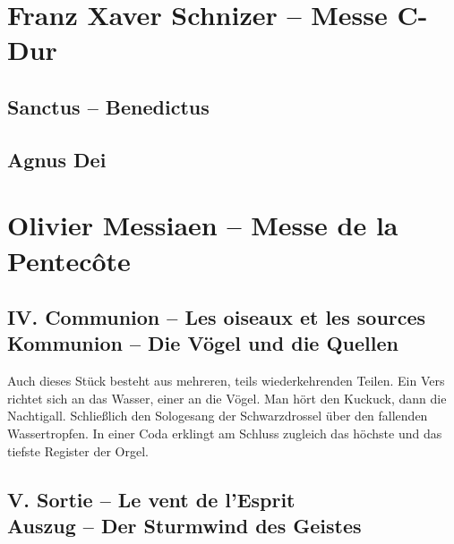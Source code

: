\documentclass[a5paper,twoside,fontsize=11pt]{scrartcl}
\newcommand{\frenchandgermantitle}[2]{\subsection*{#1 \\#2}}
\begin{document}
\section*{Franz Xaver Schnizer – Messe C-Dur}
\subsection*{Sanctus -- Benedictus}
\begin{Parallel}{0.45\textwidth}{0.5\textwidth}
    \RaggedRight
    
\end{Parallel}
\vspace{\baselineskip}

\subsection*{Agnus Dei}
\begin{Parallel}{0.45\textwidth}{0.5\textwidth}
    \RaggedRight
    
\end{Parallel}
\vspace{\baselineskip}

\newpage
\section*{Olivier Messiaen – Messe de la Pentecôte }
\frenchandgermantitle{IV. Communion – Les oiseaux et les sources}{Kommunion – Die Vögel und die Quellen}

\medskip

\noindent{}
Auch dieses Stück besteht aus mehreren, teils wiederkehrenden Teilen.
Ein Vers richtet sich an das Wasser, einer an die Vögel.
Man hört den Kuckuck, dann die Nachtigall.
Schließlich den Sologesang der Schwarzdrossel über den fallenden Wassertropfen.
In einer Coda erklingt am Schluss zugleich das höchste und das tiefste Register der Orgel.

\frenchandgermantitle{V. Sortie – Le vent de l’Esprit}{Auszug – Der Sturmwind des Geistes}
\end{document}
